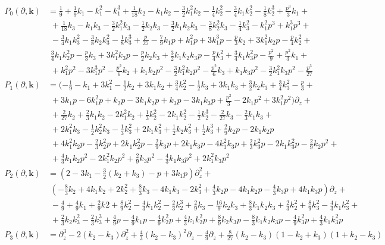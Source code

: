 \documentclass{article}
\begin{document}
\begin{align*}
P_0(\partial,\mathbf{k})&=\frac{1}{9}+\frac{1}{9}k_1-k_1^2-k_1^3+\frac{1}{18}k_2 -k_1k_2-\frac{3}{2}k_1^2k_2-\frac{1}{4}k_2^2-\frac{3}{4}k_1k_2^2-\frac{1}{8}k_2^3+\frac{p^3}{3}k_1+\\
&\,\,+\frac{1}{18}k_3-k_1k_3-\frac{3}{2}k_1^2 k_3-\frac{1}{2}k_2k_3-\frac{3}{2}k_1k_2k_3-\frac{3}{8}k_2^2k_3-\frac{1}{4}k_3^2-k_1^2 p^3+k_1^3 p^3+\\
&\,\,-\frac{3}{4}k_1k_3^2-\frac{3}{8}k_2k_3^2-\frac{1}{8}k_3^3+\frac{p}{27}-\frac{7}{9}k_1 p+k_1^2 p+3k_1^3 p-\frac{p}{3}k_2+3 k_1^2k_2 p-\frac{p}{4}k_2^2+\\
&\,\,\frac{3}{4}k_1k_2^2 p-\frac{p}{3}k_3+3 k_1^2k_3 p-\frac{p}{2}k_2k_3+\frac{3}{2}k_1k_2k_3p-\frac{p}{4}k_3^2+\frac{3}{4}k_1k_3^2 p-\frac{p^2}{9}+\frac{p^2}{3}k_1+\\
&\,\,+k_1^2 p^2 -3k_1^3 p^2-\frac{p^2}{6}k_2+k_1k_2 p^2-\frac{3}{2}k_1^2k_2 p^2-\frac{p^2}{6}k_3+k_1k_3 p^2-\frac{3}{2}k_1^2k_3 p^2-\frac{p^3}{27}\\
P_1(\partial,\mathbf{k})&=(-\frac{1}{9}-k_1+3k_1^2-\frac{1}{2}k_2+3k_1 k_2+\frac{3}{4}k_2^2-\frac{1}{2}k_3+3k_1k_3+\frac{3}{2}k_2k_3+\frac{3}{4}k_3^2-\frac{p}{3}+\\
&\,\,+3 k_1p-6k_1^2 p+k_2 p -3 k_1k_2 p+k_3 p-3 k_1k_3 p+\frac{p^2}{3}-2k_1 p^2 +3k_1^2p^2 )\partial_z +\\
&\,\,+\frac{2}{27}k_2 +\frac{2}{3}k_1k_2-2k_1^2k_2+\frac{1}{3}k_2^2-2 k_1k_2^2-\frac{1}{2}k_2^3-\frac{2}{27}k_3-\frac{2}{3}k_1k_3+\\
&\,\,+2k_1^2k_3-\frac{1}{2}k_2^2k_3-\frac{1}{3}k_3^2+2k_1k_3^2+\frac{1}{2}k_2k_3^2+\frac{1}{2}k_3^3+\frac{2}{9}k_2 p-2k_1k_2 p\\
&\,\,+4 k_1^2k_2 p-\frac{2}{3}k_2^2 p+2k_1k_2^2 p-\frac{2}{9}k_3 p+2 k_1k_3 p-4k_1^2k_3 p+\frac{2}{3}k_3^2 p-2k_1k_3^2 p-\frac{2}{9}k_2 p^2+\\
&\,\,+\frac{4}{3}k_1k_2p^2-2k_1^2k_2p^2+\frac{2}{9}k_3p^2-\frac{4}{3}k_1k_3p^2+2k_1^2k_3p^2\\
P_2(\partial,\mathbf{k})&=(2-3k_1-\frac{3}{2}(k_2+k_3)-p+3k_1p)\partial^2_z +\\
&\,\, (-\frac{8}{3} k_2+ 4k_1k_2 +2k_2^2 +\frac{8}{3}k_3-4k_1k_3-2k_3^2+\frac{4}{3}k_2 p-4k_1k_2 p-\frac{4}{3}k_3 p+4k_1k_3 p) \partial_z +\\
&\,\,-\frac{4}{9}+\frac{4}{9} k_1+\frac{2}{9} k2 +\frac{8}{9}k_2^2 -\frac{4}{3}k_1 k_2^2-\frac{2}{3}k_2^3+\frac{2}{9} k_3-\frac{16}{9} k_2 k_3+\frac{8}{3}k_1k_2 k_3+\frac{2}{3}k_2^2+\frac{8}{9}k_3^2-\frac{4}{3}k_1k_3^2+\\
&\,\,+\frac{2}{3}k_2k_3^2-\frac{2}{3}k_3^3+\frac{4}{9}p-\frac{4}{9}k_1p-\frac{4}{9}k_2^2 p+\frac{4}{3} k_1 k_2^2 p +\frac{8}{9}k_2k_3 p-\frac{8}{3} k_1 k_2 k_3p-\frac{4}{9}k_3^2 p+\frac{4}{3}k_1 k_3^2 p \\
P_3(\partial,\mathbf{k})&=\partial_z^3-2(k_2-k_3)\partial_z^2+\frac{4}{3}(k_2-k_3)^2\partial_z-\frac{4}{9}\partial_z+\frac{8}{27}(k_2-k_3)(1-k_2+k_3)(1+k_2-k_3)
\end{align*}
\end{document}
